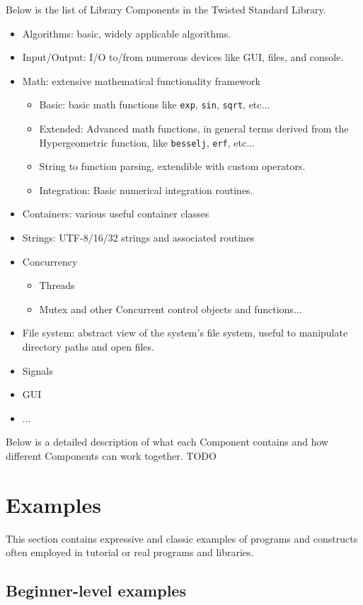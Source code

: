 \documentclass[a4paper,11pt]{report}
\newcommand{\tcode}[1]{\texttt{#1}}
\begin{document}
Below is the list of Library Components in the Twisted Standard Library.
\begin{itemize}
  \item Algorithms: basic, widely applicable algorithms.
  \item Input/Output: I/O to/from numerous devices like GUI, files, and console.
  \item Math: extensive mathematical functionality framework
  \begin{itemize}
    \item Basic: basic math functions like \tcode{exp}, \tcode{sin}, \tcode{sqrt}, etc...
    \item Extended: Advanced math functions, in general terms derived from the Hypergeometric function, like \tcode{besselj}, \tcode{erf}, etc...
    \item String to function parsing, extendible with custom operators.
    \item Integration: Basic numerical integration routines.
  \end{itemize}
  \item Containers: various useful container classes
  \item Strings: UTF-8/16/32 strings and associated routines
  \item Concurrency
  \begin{itemize}
    \item Threads
    \item Mutex and other Concurrent control objects and functions...
  \end{itemize}
  \item File system: abstract view of the system's file system, useful to manipulate directory paths and open files.
  \item Signals
  \item GUI
  \item ...
\end{itemize}
Below is a detailed description of what each Component contains and how different Components can work together.
TODO

\section{Examples} \label{sec:examples}
This section contains expressive and classic examples of programs and constructs often employed in tutorial or real programs and libraries.

  \subsection{Beginner-level examples}
\end{document}
